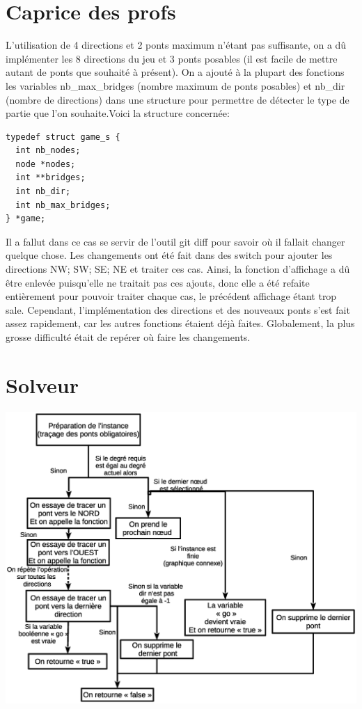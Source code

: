 \documentclass[12pt]{report}
\begin{document}
\chapter{Caprice des profs}
L'utilisation de 4 directions et 2 ponts maximum n'étant pas suffisante, on a dû implémenter les 8 directions du jeu et 3 ponts posables (il est facile de mettre autant de ponts que souhaité à présent).
On a ajouté à la plupart des fonctions les variables nb\_max\_bridges (nombre maximum de ponts posables) et nb\_dir (nombre de directions) dans une structure pour permettre de détecter le type de partie que l'on souhaite.Voici la structure concernée:
\begin{verbatim}
typedef struct game_s {
  int nb_nodes;
  node *nodes;
  int **bridges;
  int nb_dir;
  int nb_max_bridges;
} *game;
\end{verbatim}
Il a fallut dans ce cas se servir de l'outil git diff pour savoir où il fallait changer quelque chose. Les changements ont été fait dans des switch pour ajouter les directions NW; SW; SE; NE et traiter ces cas. Ainsi, la fonction d'affichage a dû être enlevée puisqu'elle ne traitait pas ces ajouts, donc elle a été refaite entièrement pour pouvoir traiter chaque cas, le précédent affichage étant trop sale. Cependant, l'implémentation des directions et des nouveaux ponts s'est fait assez rapidement, car les autres fonctions étaient déjà faites. Globalement, la plus grosse difficulté était de repérer où faire les changements.


\chapter{Solveur}
\includegraphics[width = 1.00\textwidth]{explication_solveur.eps}
\end{document}
